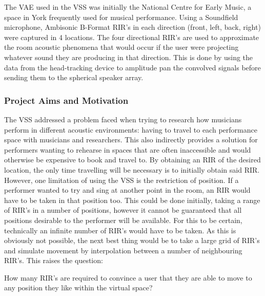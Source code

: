 \documentclass[../../main.tex]{subfiles}
\begin{document}
		The \ac{VAE} used in the \ac{VSS} was initially the National Centre for Early Music, a space in York frequently used for musical performance. Using a Soundfield microphone, Ambisonic B-Format \ac{RIR}'s in each direction (front, left, back, right) were captured in 4 locations. The four directional \ac{RIR}'s are used to approximate the room acoustic phenomena that would occur if the user were projecting whatever sound they are producing in that direction. This is done by using the data from the head-tracking device to amplitude pan the convolved signals before sending them to the spherical speaker array.


	\subsubsection{Project Aims and Motivation}
	\label{background:aims}
		
		The \ac{VSS} addressed a problem faced when trying to research how musicians perform in different acoustic environments: having to travel to each performance space with musicians and researchers. This also indirectly provides a solution for performers wanting to rehearse in spaces that are often inaccessible and would otherwise be expensive to book and travel to. By obtaining an \ac{RIR} of the desired location, the only time travelling will be necessary is to initially obtain said \ac{RIR}. However, one limitation of using the \ac{VSS} is the restriction of position. If a performer wanted to try and sing at another point in the room, an \ac{RIR} would have to be taken in that position too. This could be done initially, taking a range of \ac{RIR}'s in a number of positions, however it cannot be guaranteed that all positions desirable to the performer will be available. For this to be certain, technically an infinite number of \ac{RIR}'s would have to be taken. As this is obviously not possible, the next best thing would be to take a large grid of \ac{RIR}'s and simulate movement by interpolation between a number of neighbouring \ac{RIR}'s. This raises the question:



		 \vspace{5mm}
		 \begin{center}
		 \begin{minipage}{0.7\textwidth}
		 How many \ac{RIR}'s are required to convince a user that they are able to move to any position they like within the virtual space?
		 \end{minipage}
		 \end{center}
		 \vspace{5mm}
\end{document}
